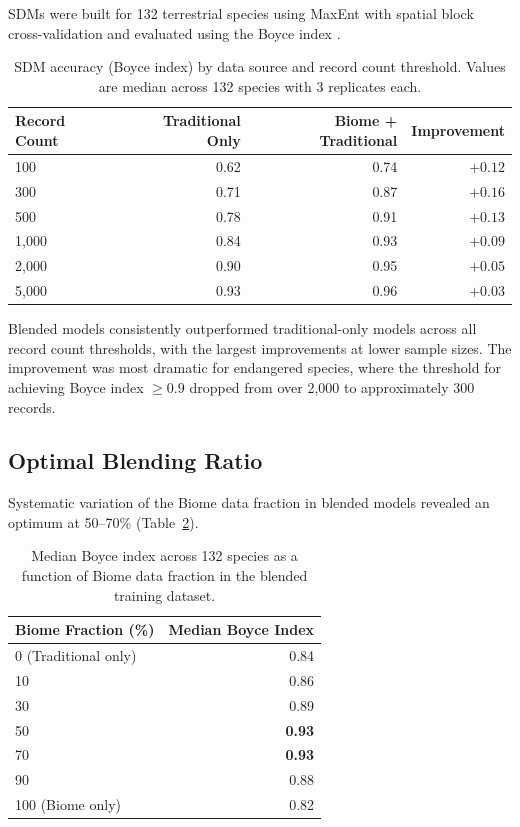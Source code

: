 \documentclass[11pt]{article}
\begin{document}
SDMs were built for 132 terrestrial species using MaxEnt \citep{phillips2006maximum, elith2011statistical} with spatial block cross-validation \citep{roberts2017cross} and evaluated using the Boyce index \citep{boyce2002evaluating}.

\begin{table}[H]
\centering
\caption{SDM accuracy (Boyce index) by data source and record count threshold. Values are median across 132 species with 3 replicates each.}
\label{tab:sdm}
\begin{tabular}{lrrr}
\toprule
\textbf{Record Count} & \textbf{Traditional Only} & \textbf{Biome + Traditional} & \textbf{Improvement} \\
\midrule
100 & 0.62 & 0.74 & $+0.12$ \\
300 & 0.71 & 0.87 & $+0.16$ \\
500 & 0.78 & 0.91 & $+0.13$ \\
1,000 & 0.84 & 0.93 & $+0.09$ \\
2,000 & 0.90 & 0.95 & $+0.05$ \\
5,000 & 0.93 & 0.96 & $+0.03$ \\
\bottomrule
\end{tabular}
\end{table}

Blended models consistently outperformed traditional-only models across all record count thresholds, with the largest improvements at lower sample sizes. The improvement was most dramatic for endangered species, where the threshold for achieving Boyce index $\geq 0.9$ dropped from over 2,000 to approximately 300 records.

\subsection{Optimal Blending Ratio}

Systematic variation of the Biome data fraction in blended models revealed an optimum at 50--70\% (Table~\ref{tab:blending}).

\begin{table}[H]
\centering
\caption{Median Boyce index across 132 species as a function of Biome data fraction in the blended training dataset.}
\label{tab:blending}
\begin{tabular}{lr}
\toprule
\textbf{Biome Fraction (\%)} & \textbf{Median Boyce Index} \\
\midrule
0 (Traditional only) & 0.84 \\
10 & 0.86 \\
30 & 0.89 \\
50 & \textbf{0.93} \\
70 & \textbf{0.93} \\
90 & 0.88 \\
100 (Biome only) & 0.82 \\
\bottomrule
\end{tabular}
\end{table}
\end{document}
